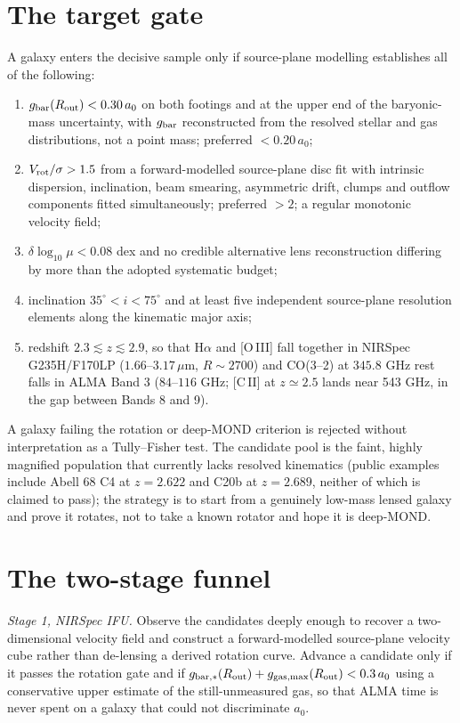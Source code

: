 \documentclass[11pt,letterpaper]{article}
\begin{document}
\section{The target gate}
A galaxy enters the decisive sample only if source-plane modelling establishes all of the following:
\begin{enumerate}
\item $g_{\rm bar}(R_{\rm out})<0.30\,a_0$ on both footings and at the upper end of the baryonic-mass uncertainty, with $g_{\rm bar}$ reconstructed from the resolved stellar and gas distributions, not a point mass; preferred $<0.20\,a_0$;
\item $V_{\rm rot}/\sigma>1.5$ from a forward-modelled source-plane disc fit with intrinsic dispersion, inclination, beam smearing, asymmetric drift, clumps and outflow components fitted simultaneously; preferred $>2$; a regular monotonic velocity field;
\item $\delta\log_{10}\mu<0.08$ dex and no credible alternative lens reconstruction differing by more than the adopted systematic budget;
\item inclination $35^\circ<i<75^\circ$ and at least five independent source-plane resolution elements along the kinematic major axis;
\item redshift $2.3\lesssim z\lesssim2.9$, so that H$\alpha$ and [O\,III] fall together in NIRSpec G235H/F170LP ($1.66$--$3.17\,\mu$m, $R\sim2700$) and CO(3--2) at $345.8$ GHz rest falls in ALMA Band 3 ($84$--$116$ GHz; [C\,II] at $z\simeq2.5$ lands near 543 GHz, in the gap between Bands 8 and 9).
\end{enumerate}
A galaxy failing the rotation or deep-MOND criterion is rejected without interpretation as a Tully--Fisher test. The candidate pool is the faint, highly magnified population that currently lacks resolved kinematics (public examples include Abell 68 C4 at $z=2.622$ and C20b at $z=2.689$, neither of which is claimed to pass); the strategy is to start from a genuinely low-mass lensed galaxy and prove it rotates, not to take a known rotator and hope it is deep-MOND.

\section{The two-stage funnel}
\emph{Stage 1, NIRSpec IFU.} Observe the candidates deeply enough to recover a two-dimensional velocity field and construct a forward-modelled source-plane velocity cube rather than de-lensing a derived rotation curve. Advance a candidate only if it passes the rotation gate and if $g_{{\rm bar},*}(R_{\rm out})+g_{{\rm gas,max}}(R_{\rm out})<0.3\,a_0$ using a conservative upper estimate of the still-unmeasured gas, so that ALMA time is never spent on a galaxy that could not discriminate $a_0$.
\end{document}
